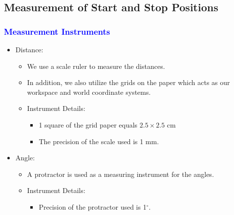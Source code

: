 \documentclass[10pt,a4paper]{article}
\begin{document}
			\subsection{Measurement of Start and Stop Positions}
				\subsubsection{\textcolor{blue}{Measurement Instruments}}
					\begin{itemize}
						\item Distance:
						\begin{itemize}
							\item We use a scale ruler to measure the distances.
							\item In addition, we also utilize the grids on the paper which acts as our workspace and world coordinate systems.
							\item Instrument Details:
							\begin{itemize}
								\item 1 square of the grid paper equals $2.5 \times 2.5$ cm
								\item The precision of the scale used is 1 mm.
							\end{itemize}
						\end{itemize}
						\item Angle:
						\begin{itemize}
							\item A protractor is used as a measuring instrument for the angles.
							\item Instrument Details:
							\begin{itemize}
								\item Precision of the protractor used is 1$^\circ$.
							\end{itemize}
						\end{itemize}
					\end{itemize}
\end{document}
